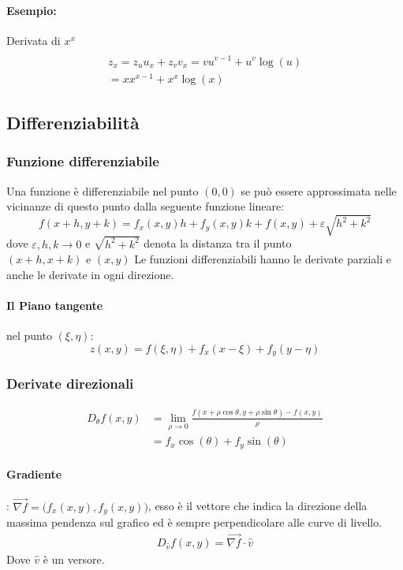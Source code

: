 \documentclass[16pt]{article}
\begin{document}
\paragraph{Esempio:}
Derivata di $x^x$
\begin{align*}
	[u = x, v = x, z = u^v] \\
	z_x = z_u u_x + z_v v_x = vu^{v-1} + u^v\log(u) \\
	= xx^{x-1} + x^x\log(x)
\end{align*}


\subsection{Differenziabilità}

\subsubsection{Funzione differenziabile} Una funzione è differenziabile nel punto $(0,0)$ se può essere approssimata nelle vicinanze di questo punto dalla seguente funzione lineare:
\begin{equation}
	f(x+h, y+k) = f_x(x,y)h + f_y(x,y)k + f(x,y) + \varepsilon \sqrt{h^2 + k^2}
\end{equation}
dove $\varepsilon, h, k \rightarrow 0$ e $\sqrt{h^2 + k^2}$ denota la distanza tra il punto $(x+h,x+k) \text{ e } (x,y)$
Le funzioni differenziabili hanno le derivate parziali e anche le derivate in ogni direzione.
\paragraph{Il Piano tangente} nel punto $(\xi, \eta)$:
\begin{equation}
	z(x,y) = f(\xi, \eta) + f_{x}(x - \xi) + f_{y}(y-\eta)
\end{equation}
\subsubsection{Derivate direzionali}
\begin{align*}
	D_{\theta}f(x,y) & = \lim_{\rho \rightarrow 0} \frac{f(x+\rho \cos\theta, y+\rho\sin\theta) - f(x,y)}{\rho} \\
			   & = f_x \cos(\theta) + f_y \sin(\theta)
\end{align*}
\paragraph{Gradiente}: $\vec{\nabla f} = \Big(f_x(x,y), f_y(x,y)\Big)$, esso è il vettore che indica la direzione della massima pendenza sul grafico ed è sempre perpendicolare alle curve di livello.
\begin{align*}
	D_{\hat{v}}f(x,y) = \vec{\nabla f} \cdot \hat{v}
\end{align*}
Dove $\hat{v}$ è un versore.
\end{document}
